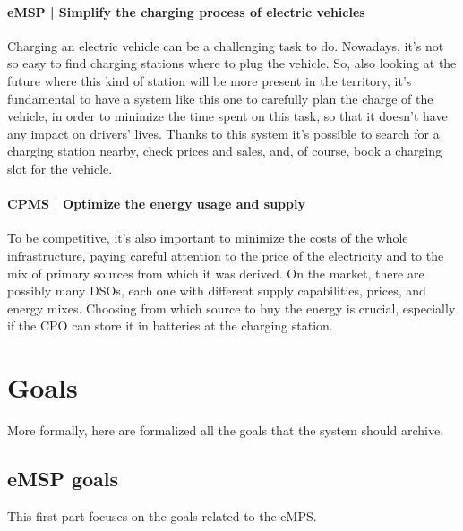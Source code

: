 \paragraph{eMSP | Simplify the charging process of electric vehicles} Charging an electric vehicle can be a challenging task to do. Nowadays, it's not so easy to find charging stations where to plug the vehicle. So, also looking at the future where this kind of station will be more present in the territory, it's fundamental to have a system like this one to carefully plan the charge of the vehicle, in order to minimize the time spent on this task, so that it doesn't have any impact on drivers' lives. Thanks to this system it's possible to search for a charging station nearby, check prices and sales, and, of course, book a charging slot for the vehicle.

\paragraph{CPMS | Optimize the energy usage and supply} To be competitive, it's also important to minimize the costs of the whole infrastructure, paying careful attention to the price of the electricity and to the mix of primary sources from which it was derived. On the market, there are possibly many DSOs, each one with different supply capabilities, prices, and energy mixes. Choosing from which source to buy the energy is crucial, especially if the CPO can store it in batteries at the charging station.

\pagebreak

\section{Goals}

More formally, here are formalized all the goals that the system should archive.

\subsection{eMSP goals}

This first part focuses on the goals related to the eMPS.


